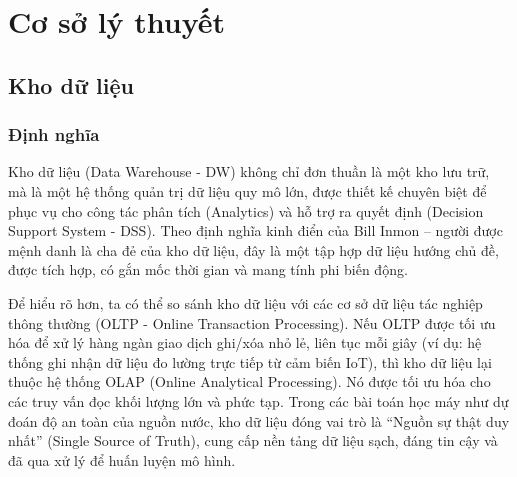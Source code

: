 \section{Cơ sở lý thuyết}

\subsection{Kho dữ liệu}

\subsubsection{Định nghĩa}
Kho dữ liệu (Data Warehouse - DW) không chỉ đơn thuần là một kho lưu trữ, mà là một hệ thống quản trị dữ liệu quy mô lớn, được thiết kế chuyên biệt để phục vụ cho công tác phân tích (Analytics) và hỗ trợ ra quyết định (Decision Support System - DSS). Theo định nghĩa kinh điển của Bill Inmon – người được mệnh danh là cha đẻ của kho dữ liệu, đây là một tập hợp dữ liệu hướng chủ đề, được tích hợp, có gắn mốc thời gian và mang tính phi biến động. 

Để hiểu rõ hơn, ta có thể so sánh kho dữ liệu với các cơ sở dữ liệu tác nghiệp thông thường (OLTP - Online Transaction Processing). Nếu OLTP được tối ưu hóa để xử lý hàng ngàn giao dịch ghi/xóa nhỏ lẻ, liên tục mỗi giây (ví dụ: hệ thống ghi nhận dữ liệu đo lường trực tiếp từ cảm biến IoT), thì kho dữ liệu lại thuộc hệ thống OLAP (Online Analytical Processing). Nó được tối ưu hóa cho các truy vấn đọc khối lượng lớn và phức tạp. Trong các bài toán học máy như dự đoán độ an toàn của nguồn nước, kho dữ liệu đóng vai trò là ``Nguồn sự thật duy nhất'' (Single Source of Truth), cung cấp nền tảng dữ liệu sạch, đáng tin cậy và đã qua xử lý để huấn luyện mô hình.

